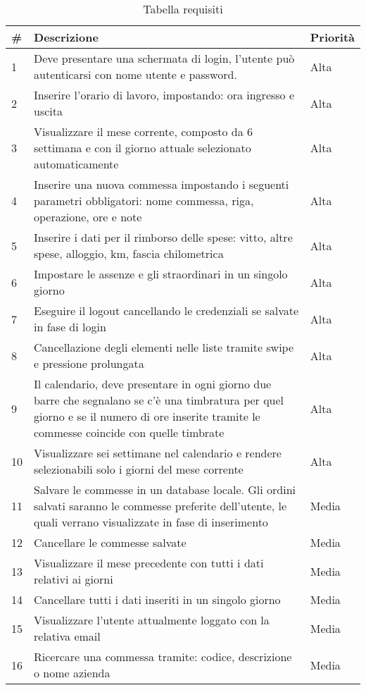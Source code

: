 \begin{table}
	\caption{Tabella requisiti}
	\begin{tabular}{||l||l|l|}
		\hline
		\# & Descrizione & Priorità \\ \hline
		1 & Deve presentare una schermata di login,  l'utente può autenticarsi con nome utente e password. & Alta \\ \hline
		2 & Inserire l'orario di lavoro, impostando: ora ingresso e uscita & Alta \\ \hline
		3 & Visualizzare il mese corrente, composto da 6 settimana e con il giorno attuale selezionato automaticamente & Alta \\ \hline
		4 & Inserire una nuova commessa impostando i seguenti parametri obbligatori: nome commessa, riga, operazione, ore e note & Alta \\ \hline
		5 & Inserire i dati per il rimborso delle spese: vitto, altre spese, alloggio, km, fascia chilometrica & Alta \\ \hline
		6 & Impostare le assenze e gli straordinari in un singolo giorno & Alta \\ \hline
		7 & Eseguire il logout cancellando le credenziali se salvate in fase di login & Alta \\ \hline
		8 & Cancellazione degli elementi nelle liste tramite swipe e pressione prolungata & Alta \\ \hline
		9 & Il calendario, deve presentare in ogni giorno due barre che segnalano se c'è una timbratura per quel giorno e se il numero di ore inserite tramite le commesse coincide con quelle timbrate & Alta \\ \hline
		10 & Visualizzare sei settimane nel calendario e rendere selezionabili solo i giorni del mese corrente & Alta \\ \hline
		11 & Salvare le commesse in un database locale. Gli ordini salvati saranno le commesse preferite dell'utente, le quali verrano visualizzate in fase di inserimento & Media \\ \hline
		12 & Cancellare le commesse salvate & Media \\ \hline
		13 & Visualizzare il mese precedente con tutti i dati relativi ai giorni & Media \\ \hline
		14 & Cancellare tutti i dati inseriti in un singolo giorno & Media \\ \hline
		15 & Visualizzare l'utente attualmente loggato con la relativa email & Media \\ \hline
		16 & Ricercare una commessa tramite: codice, descrizione o nome azienda & Media \\ \hline

\end{tabular}
\end{table}
